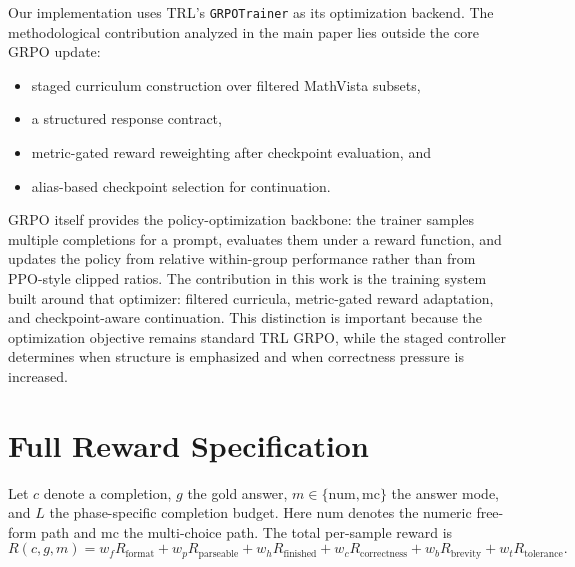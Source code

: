 \documentclass{article} %
\begin{document}
Our implementation uses TRL's \texttt{GRPOTrainer} as its optimization backend. The methodological contribution analyzed in the main paper lies outside the core GRPO update:
\begin{itemize}[leftmargin=1.2em]
\item staged curriculum construction over filtered MathVista subsets,
\item a structured response contract,
\item metric-gated reward reweighting after checkpoint evaluation, and
\item alias-based checkpoint selection for continuation.
\end{itemize}
GRPO itself provides the policy-optimization backbone: the trainer samples multiple completions for a prompt, evaluates them under a reward function, and updates the policy from relative within-group performance rather than from PPO-style clipped ratios. The contribution in this work is the training system built around that optimizer: filtered curricula, metric-gated reward adaptation, and checkpoint-aware continuation. This distinction is important because the optimization objective remains standard TRL GRPO, while the staged controller determines when structure is emphasized and when correctness pressure is increased.

\section{Full Reward Specification}

Let $c$ denote a completion, $g$ the gold answer, $m \in \{\mathrm{num}, \mathrm{mc}\}$ the answer mode, and $L$ the phase-specific completion budget. Here $\mathrm{num}$ denotes the numeric free-form path and $\mathrm{mc}$ the multi-choice path. The total per-sample reward is
\begin{equation}
R(c,g,m)=
w_f R_{\mathrm{format}} +
w_p R_{\mathrm{parseable}} +
w_h R_{\mathrm{finished}} +
w_c R_{\mathrm{correctness}} +
w_b R_{\mathrm{brevity}} +
w_t R_{\mathrm{tolerance}}.
\end{equation}
\end{document}
